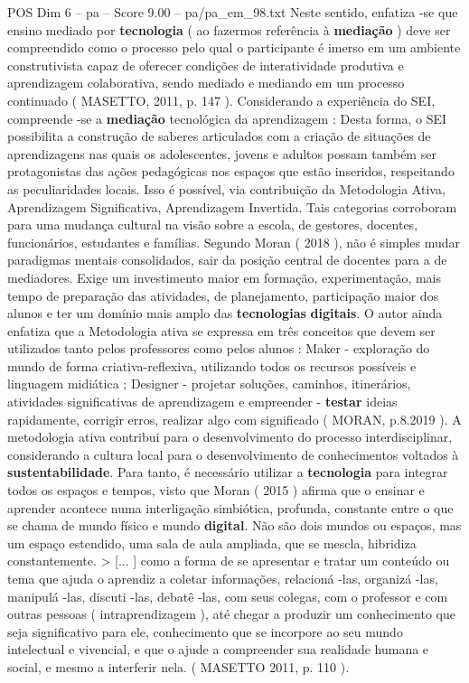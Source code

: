 \begin{textsample}{POS Dim 6 – pa – Score 9.00 – pa/pa\_em\_98.txt}
Neste sentido, enfatiza -se que ensino mediado por \textbf{tecnologia} ( ao fazermos referência à \textbf{mediação} ) deve ser compreendido como o processo pelo qual o participante é imerso em um ambiente construtivista capaz de oferecer condições de interatividade produtiva e aprendizagem colaborativa, sendo mediado e mediando em um processo continuado ( MASETTO, 2011, p. 147 ).
Considerando a experiência do SEI, compreende -se a \textbf{mediação} tecnológica da aprendizagem : Desta forma, o SEI possibilita a construção de saberes articulados com a criação de situações de aprendizagens nas quais os adolescentes, jovens e adultos possam também ser protagonistas das ações pedagógicas nos espaços que estão inseridos, respeitando as peculiaridades locais.
Isso é possível, via contribuição da Metodologia Ativa, Aprendizagem Significativa, Aprendizagem Invertida.
Tais categorias corroboram para uma mudança cultural na visão sobre a escola, de gestores, docentes, funcionários, estudantes e famílias.
Segundo Moran ( 2018 ), não é simples mudar paradigmas mentais consolidados, sair da posição central de docentes para a de mediadores.
Exige um investimento maior em formação, experimentação, mais tempo de preparação das atividades, de planejamento, participação maior dos alunos e ter um domínio mais amplo das \textbf{tecnologias} \textbf{digitais}.
O autor ainda enfatiza que a Metodologia ativa se expressa em três conceitos que devem ser utilizados tanto pelos professores como pelos alunos : Maker - exploração do mundo de forma criativa-reflexiva, utilizando todos os recursos possíveis e linguagem midiática ; Designer - projetar soluções, caminhos, itinerários, atividades significativas de aprendizagem e empreender - \textbf{testar} ideias rapidamente, corrigir erros, realizar algo com significado ( MORAN, p.8.2019 ).
A metodologia ativa contribui para o desenvolvimento do processo interdisciplinar, considerando a cultura local para o desenvolvimento de conhecimentos voltados à \textbf{sustentabilidade}.
Para tanto, é necessário utilizar a \textbf{tecnologia} para integrar todos os espaços e tempos, visto que Moran ( 2015 ) afirma que o ensinar e aprender acontece numa interligação simbiótica, profunda, constante entre o que se chama de mundo físico e mundo \textbf{digital}.
Não são dois mundos ou espaços, mas um espaço estendido, uma sala de aula ampliada, que se mescla, hibridiza constantemente. > [... ] como a forma de se apresentar e tratar um conteúdo ou tema que ajuda o aprendiz a coletar informações, relacioná -las, organizá -las, manipulá -las, discuti -las, debatê -las, com seus colegas, com o professor e com outras pessoas ( intraprendizagem ), até chegar a produzir um conhecimento que seja significativo para ele, conhecimento que se incorpore ao seu mundo intelectual e vivencial, e que o ajude a compreender sua realidade humana e social, e mesmo a interferir nela. ( MASETTO 2011, p. 110 ).

\end{textsample}
